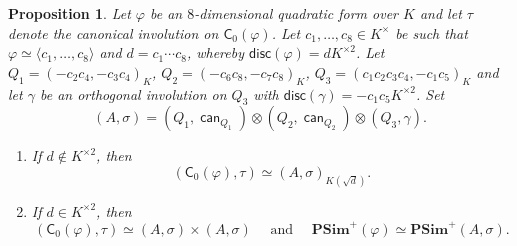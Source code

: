 \documentclass[twoside,11pt]{amsart}
\numberwithin{equation}{section}
\newtheorem{prop}[equation]{Proposition}
\theoremstyle{definition}
\newcommand{\can}{\operatorname{\mathsf{can}}}
\newcommand{\vf}{\varphi}
\newcommand{\mg}[1]{{#1}^{\times}}
\newcommand{\sq}[1]{{#1}^{\times 2}}
\newcommand{\s}{\sigma}
\newcommand{\la}{\langle}
\newcommand{\ra}{\rangle}
\newcommand{\disc}{\mathsf{disc}}
\newcommand{\C}{\mathsf{C}}
\begin{document}
\begin{prop}\label{8dim-even-Clifford-computation}
Let $\vf$ be an $8$-dimensional quadratic form over $K$ and let $\tau$ denote the canonical involution on $\C_0(\vf)$.
Let $c_1,\dots,c_8\in\mg{K}$ be such that $\vf\simeq \la c_1,\dots,c_8\ra$ and $d=c_1\cdots c_8$, whereby $\disc(\vf)=d\sq{K}$.
Let $Q_1=(-c_2c_4,-c_3c_4)_K$, $Q_2=(-c_6c_8,-c_7c_8)_K$, $Q_3=(c_1c_2c_3c_4,-c_1c_5)_K$ and let $\gamma$ be an orthogonal involution on $Q_3$ with $\disc(\gamma)=-c_1c_5\sq{K}$.
Set 
\[(A,\s)= (Q_1,\can_{Q_1})\otimes(Q_2,\can_{Q_2})\otimes (Q_3,\gamma).\] 
\begin{enumerate}[$(i)$]
    \item If $d\notin\sq{K}$, then 
\[(\C_0(\vf),\tau)\simeq (A,\s)_{K(\sqrt{d})}.\]
\item
If $d\in\sq{K}$, then 
\[(\C_0(\vf),\tau)\simeq (A,\s)\times (A,\s)\quad\text{ and }\quad\mathbf{PSim}^+(\vf) \simeq  \mathbf{PSim}^+(A,\s).\]
\end{enumerate}
\end{prop}
\end{document}
